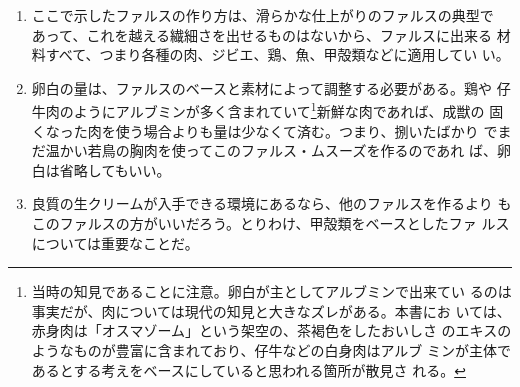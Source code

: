 \begin{recette}
\begin{enumerate}
\def\labelenumi{\arabic{enumi}.}
\setcounter{enumi}{1}
\item
  ここで示したファルスの作り方は、滑らかな仕上がりのファルスの典型で
  あって、これを越える繊細さを出せるものはないから、ファルスに出来る
  材料すべて、つまり各種の肉、ジビエ、鶏、魚、甲殻類などに適用してい
  い。
\item
  卵白の量は、ファルスのベースと素材によって調整する必要がある。鶏や
  仔牛肉のようにアルブミンが多く含まれていて\footnote{当時の知見であることに注意。卵白が主としてアルブミンで出来てい
    るのは事実だが、肉については現代の知見と大きなズレがある。本書にお
    いては、赤身肉は「オスマゾーム」という架空の、茶褐色をしたおいしさ
    のエキスのようなものが豊富に含まれており、仔牛などの白身肉はアルブ
    ミンが主体であるとする考えをベースにしていると思われる箇所が散見さ
    れる。}新鮮な肉であれば、成獣の
  固くなった肉を使う場合よりも量は少なくて済む。つまり、捌いたばかり
  でまだ温かい若鳥の胸肉を使ってこのファルス・ムスーズを作るのであれ
  ば、卵白は省略してもいい。
\item
  良質の生クリームが入手できる環境にあるなら、他のファルスを作るより
  もこのファルスの方がいいだろう。とりわけ、甲殻類をベースとしたファ
  ルスについては重要なことだ。
\end{enumerate}
\end{recette}
